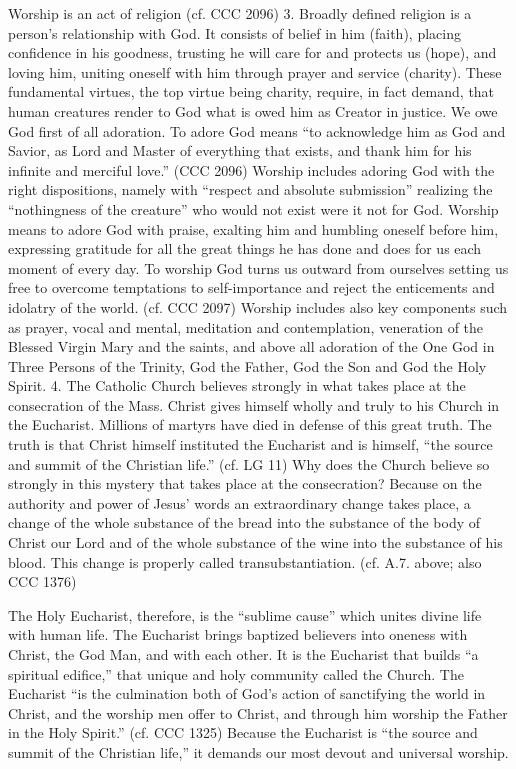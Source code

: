 \documentclass[oneside]{book}
\begin{document}
Worship is an act of religion (cf. CCC 2096)
3. Broadly defined religion is a person's relationship with God. It consists of
belief in him (faith), placing confidence in his goodness, trusting he will care
for and protects us (hope), and loving him, uniting oneself with him through
prayer and service (charity). These fundamental virtues, the top virtue being
charity, require, in fact demand, that human creatures render to God what is
owed him as Creator in justice. We owe God first of all adoration. To adore God
means ``to acknowledge him as God and Savior, as Lord and Master of everything
that exists, and thank him for his infinite and merciful love.'' (CCC 2096)
Worship includes adoring God with the right dispositions, namely with ``respect
and absolute submission'' realizing the ``nothingness of the creature'' who
would not exist were it not for God. Worship means to adore God with praise,
exalting him and humbling oneself before him, expressing gratitude for all the
great things he has done and does for us each moment of every day. To worship
God turns us outward from ourselves setting us free to overcome temptations to
self-importance and reject the enticements and idolatry of the world. (cf. CCC
2097) Worship includes also key components such as prayer, vocal and mental,
meditation and contemplation, veneration of the Blessed Virgin Mary and the
saints, and above all adoration of the One God in Three Persons of the Trinity,
God the Father, God the Son and God the Holy Spirit.
4. The Catholic Church believes strongly in what takes place at the consecration
of the Mass. Christ gives himself wholly and truly to his Church in the
Eucharist. Millions of martyrs have died in defense of this great truth. The
truth is that Christ himself instituted the Eucharist and is himself, ``the
source and summit of the Christian life.'' (cf. LG 11) Why does the Church
believe so strongly in this mystery that takes place at the consecration?
Because on the authority and power of Jesus' words an extraordinary change takes
place, a change of the whole substance of the bread into the substance of the
body of Christ our Lord and of the whole substance of the wine into the
substance of his blood. This change is properly called
transubstantiation. (cf. A.7. above; also CCC 1376)

The Holy Eucharist, therefore, is the ``sublime cause'' which unites divine life
with human life. The Eucharist brings baptized believers into oneness with
Christ, the God Man, and with each other. It is the Eucharist that builds ``a
spiritual edifice,'' that unique and holy community called the Church. The
Eucharist ``is the culmination both of God's action of sanctifying the world in
Christ, and the worship men offer to Christ, and through him worship the Father
in the Holy Spirit.'' (cf. CCC 1325) Because the Eucharist is ``the source and
summit of the Christian life,'' it demands our most devout and universal worship.
\end{document}
